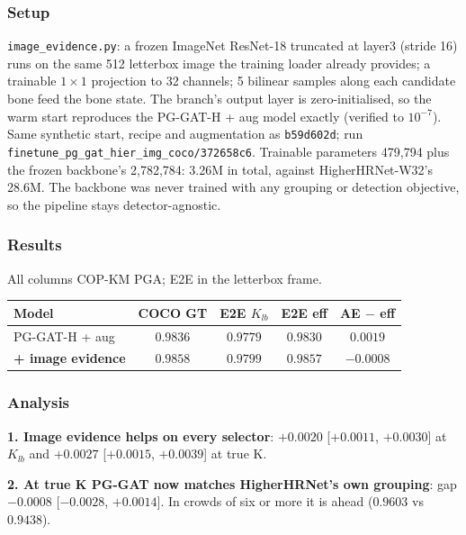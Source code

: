 \subsubsection{Setup}

\texttt{image\_evidence.py}: a frozen ImageNet ResNet-18 truncated at layer3 (stride 16) runs on the same 512 letterbox image the training loader already provides; a trainable $1{\times}1$ projection to 32 channels; 5 bilinear samples along each candidate bone feed the bone state.
The branch's output layer is zero-initialised, so the warm start reproduces the PG-GAT-H + aug model exactly (verified to $10^{-7}$).
Same synthetic start, recipe and augmentation as \texttt{b59d602d}; run \texttt{finetune\_pg\_gat\_hier\_img\_coco/372658c6}.
Trainable parameters 479,794 plus the frozen backbone's 2,782,784: 3.26M in total, against HigherHRNet-W32's 28.6M.
The backbone was never trained with any grouping or detection objective, so the pipeline stays detector-agnostic.

\subsubsection{Results}

All columns COP-KM PGA; E2E in the letterbox frame.

\vspace{0.5em}

\begin{tabular}{lcccc}
\hline
\textbf{Model} & \textbf{COCO GT} & \textbf{E2E $K_{lb}$} & \textbf{E2E eff} & \textbf{AE $-$ eff} \\
\hline
PG-GAT-H + aug              & $0.9836$ & $0.9779$ & $0.9830$ & $0.0019$ \\
\textbf{+ image evidence}   & $\mathbf{0.9858}$ & $\mathbf{0.9799}$ & $\mathbf{0.9857}$ & $\mathbf{-0.0008}$ \\
\hline
\end{tabular}

\subsubsection{Analysis}

\textbf{1. Image evidence helps on every selector}: $+0.0020$ [$+0.0011$, $+0.0030$] at $K_{lb}$ and $+0.0027$ [$+0.0015$, $+0.0039$] at true K.

\textbf{2. At true K PG-GAT now matches HigherHRNet's own grouping}: gap $-0.0008$ [$-0.0028$, $+0.0014$]. In crowds of six or more it is ahead ($0.9603$ vs $0.9438$).

